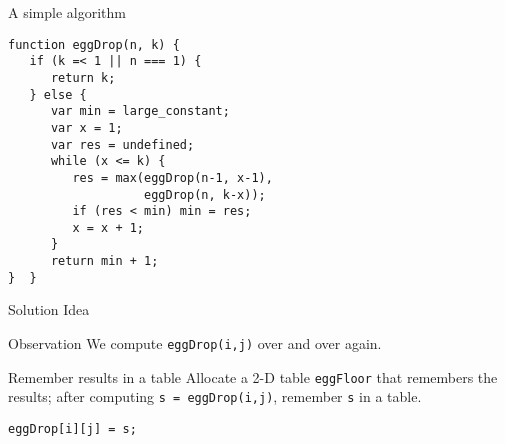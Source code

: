 \begin{frame}[fragile]{A simple algorithm}
\begin{lstlisting}
function eggDrop(n, k) {
   if (k =< 1 || n === 1) {
      return k;
   } else {
      var min = large_constant;
      var x = 1;
      var res = undefined;
      while (x <= k) {
         res = max(eggDrop(n-1, x-1),
                   eggDrop(n, k-x));
         if (res < min) min = res;
         x = x + 1;
      }
      return min + 1;
}  }
\end{lstlisting}
\end{frame}


\begin{frame}[fragile]{Solution Idea}

\begin{block}{Observation}
We compute \lstinline{eggDrop(i,j)} over and over again.
\end{block}


\begin{block}{Remember results in a table}
Allocate a 2-D table \lstinline{eggFloor} that remembers
the results; after computing \lstinline{s = eggDrop(i,j)},
remember \lstinline{s} in a table.
\end{block}

\begin{lstlisting}
eggDrop[i][j] = s;
\end{lstlisting}

\end{frame}

